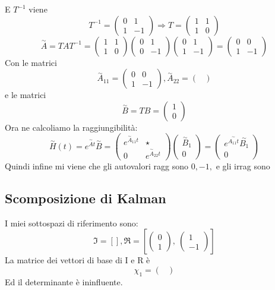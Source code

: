 \documentclass{article}
\begin{document}
E $T^{-1}$ viene \[ T^{-1} = \left(\begin{matrix}0 & 1\\1 & -1\end{matrix}\right) \Longrightarrow T = \left(\begin{matrix}1 & 1\\1 & 0\end{matrix}\right) \]
\[ \overset{\sim}{A} = T A  T^{-1} = \left(\begin{matrix}1 & 1\\1 & 0\end{matrix}\right)\left(\begin{matrix}0 & 1\\0 & -1\end{matrix}\right)\left(\begin{matrix}0 & 1\\1 & -1\end{matrix}\right) = \left(\begin{matrix}0 & 0\\1 & -1\end{matrix}\right) \]Con le matrici \[ \overset{\sim}{A}_{11} = \left(\begin{matrix}0 & 0\\1 & -1\end{matrix}\right) , \overset{\sim}{A}_{22} = \left(\begin{matrix}\end{matrix}\right)  \]e le matrici \[ \overset{\sim}{B} = TB = \left(\begin{matrix}1\\0\end{matrix}\right)  \]
Ora ne calcoliamo la raggiungibilità: \[ \overset{\sim}{H}(t) = e^{\overset{\sim}{A}t}\overset{\sim}{B} = \begin{pmatrix} e^{\overset{\sim}{A}_{11}t} &  \star \\ 0 & e^{\overset{\sim}{A}_{22}t} \end{pmatrix} \begin{pmatrix} \overset{\sim}{B}_1 \\ 0 \end{pmatrix} = \begin{pmatrix} e^{\overset{\sim}{A_{11}t}}\overset{\sim}{B_1} \\ 0 \end{pmatrix} \]
Quindi infine mi viene che gli autovalori ragg sono $ 0, -1,  $ e gli irrag sono $  $
\subsection{Scomposizione di Kalman}
I miei sottospazi di riferimento sono:	\[ \mathfrak{I} = \left[ \right], \mathfrak{R} = \left[ \left(\begin{matrix}0\\1\end{matrix}\right), \  \left(\begin{matrix}1\\-1\end{matrix}\right)\right] \]
La matrice dei vettori di base di I e R è \[ \chi_1 =  \left(\begin{matrix}\end{matrix}\right) \]Ed il determinante è ininfluente.
\end{document}
